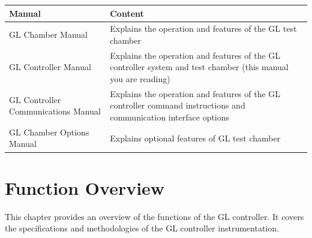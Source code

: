 \begin{longtable}[]{@{}ll@{}}
\toprule
\begin{minipage}[b]{0.28\columnwidth}\raggedright
Manual\strut
\end{minipage} & \begin{minipage}[b]{0.66\columnwidth}\raggedright
Content\strut
\end{minipage}\tabularnewline
\midrule
\endhead
\begin{minipage}[t]{0.28\columnwidth}\raggedright
GL Chamber Manual\strut
\end{minipage} & \begin{minipage}[t]{0.66\columnwidth}\raggedright
Explains the operation and features of the GL test chamber\strut
\end{minipage}\tabularnewline
\begin{minipage}[t]{0.28\columnwidth}\raggedright
GL Controller Manual\strut
\end{minipage} & \begin{minipage}[t]{0.66\columnwidth}\raggedright
Explains the operation and features of the GL controller system and test
chamber (this manual you are reading)\strut
\end{minipage}\tabularnewline
\begin{minipage}[t]{0.28\columnwidth}\raggedright
GL Controller Communications Manual\strut
\end{minipage} & \begin{minipage}[t]{0.66\columnwidth}\raggedright
Explains the operation and features of the GL controller command
instructions and communication interface options\strut
\end{minipage}\tabularnewline
\begin{minipage}[t]{0.28\columnwidth}\raggedright
GL Chamber Options Manual\strut
\end{minipage} & \begin{minipage}[t]{0.66\columnwidth}\raggedright
Explains optional features of GL test chamber\strut
\end{minipage}\tabularnewline
\bottomrule
\end{longtable}


\chapter{Function Overview}

This chapter provides an overview of the functions of the GL controller.
It covers the specifications and methodologies of the GL controller
instrumentation.


